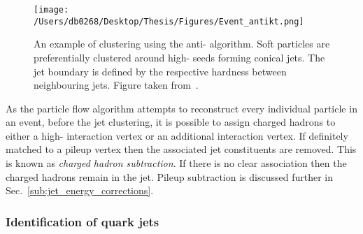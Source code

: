 \begin{figure}[htpb]
	\centering
	\texttt{[image: /Users/db0268/Desktop/Thesis/Figures/Event\_antikt.png]}
	\caption[An example of clustering using the anti-\kt{} algorithm. Soft particles are preferentially clustered around high-\pt{} seeds forming conical jets. The jet boundary is defined by the respective hardness between neighbouring jets.]{An example of clustering using the anti-\kt{} algorithm. Soft particles are preferentially clustered around high-\pt{} seeds forming conical jets. The jet boundary is defined by the respective hardness between neighbouring jets. Figure taken from~\cite{Event:antikt}.}
	\label{fig:antikt}
\end{figure}

As the particle flow algorithm attempts to reconstruct every individual particle in an event, before the jet clustering, it is possible to assign charged hadrons to either a high-\pt{} interaction vertex or an additional interaction vertex.
If definitely matched to a pileup vertex then the associated jet constituents are removed.
This is known as \textit{charged hadron subtraction}.
If there is no clear association then the charged hadrons remain in the jet.
Pileup subtraction is discussed further in Sec.~\ref{sub:jet_energy_corrections}.

\subsubsection{Identification of \bquark{} quark jets} %
\label{ssub:bqj}

